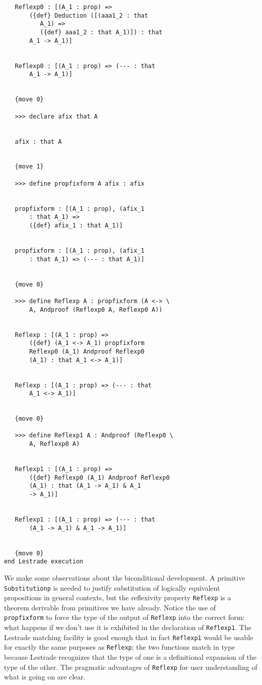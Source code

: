 \documentclass[12pt]{article}
\begin{document}
\begin{verbatim}
   Reflexp0 : [(A_1 : prop) => 
       ({def} Deduction ([(aaa1_2 : that 
          A_1) => 
          ({def} aaa1_2 : that A_1)]) : that 
       A_1 -> A_1)]


   Reflexp0 : [(A_1 : prop) => (--- : that 
       A_1 -> A_1)]


   {move 0}

   >>> declare afix that A


   afix : that A


   {move 1}

   >>> define propfixform A afix : afix


   propfixform : [(A_1 : prop), (afix_1 
       : that A_1) => 
       ({def} afix_1 : that A_1)]


   propfixform : [(A_1 : prop), (afix_1 
       : that A_1) => (--- : that A_1)]


   {move 0}

   >>> define Reflexp A : propfixform (A <-> \
       A, Andproof (Reflexp0 A, Reflexp0 A))


   Reflexp : [(A_1 : prop) => 
       ({def} (A_1 <-> A_1) propfixform 
       Reflexp0 (A_1) Andproof Reflexp0 
       (A_1) : that A_1 <-> A_1)]


   Reflexp : [(A_1 : prop) => (--- : that 
       A_1 <-> A_1)]


   {move 0}

   >>> define Reflexp1 A : Andproof (Reflexp0 \
       A, Reflexp0 A)


   Reflexp1 : [(A_1 : prop) => 
       ({def} Reflexp0 (A_1) Andproof Reflexp0 
       (A_1) : that (A_1 -> A_1) & A_1 
       -> A_1)]


   Reflexp1 : [(A_1 : prop) => (--- : that 
       (A_1 -> A_1) & A_1 -> A_1)]


   {move 0}
end Lestrade execution
\end{verbatim}

We make some observations about the biconditional development.  A primitive {\tt Substitutionp} is needed to justify substitution of logically equivalent propositions in general contexts, but the reflexivity property {\tt Reflexp} is a theorem derivable from primitives we have already.  Notice the use of {\tt propfixform} to force the type of the output of {\tt Reflexp} into the correct form:  what happens if we don't use it is exhibited in  the declaration of {\tt Reflexp1}.  The Lestrade matching facility is good enough that in fact {\tt Reflexp1} would be usable for exactly the same purposes as {\tt Reflexp};  the two functions match in type because Lestrade recognizes that the type of one is a definitional expansion of the type of the other.  The pragmatic advantages of {\tt Reflexp} for user understanding of what is going on are clear.
\end{document}
